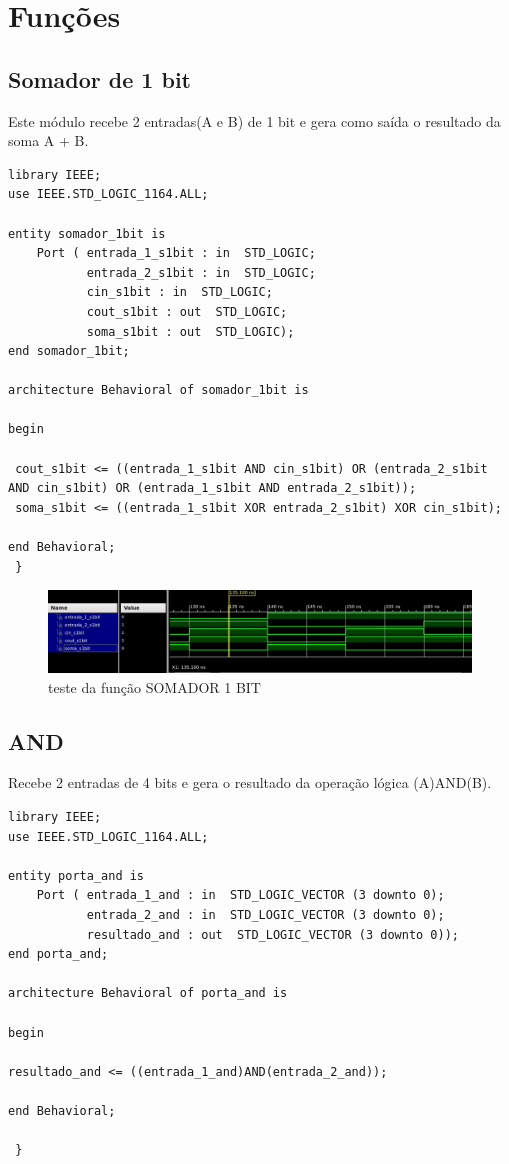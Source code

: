 \documentclass[a4paper,12pt,twoside]{article}
\begin{document}
\section{Funções}
\subsection{Somador de 1 bit}
    Este módulo recebe 2 entradas(A e B) de 1 bit e gera como saída o resultado da soma A + B.
    
\begin{lstlisting}
library IEEE;
use IEEE.STD_LOGIC_1164.ALL;

entity somador_1bit is
    Port ( entrada_1_s1bit : in  STD_LOGIC;
           entrada_2_s1bit : in  STD_LOGIC;
           cin_s1bit : in  STD_LOGIC;
           cout_s1bit : out  STD_LOGIC;
           soma_s1bit : out  STD_LOGIC);
end somador_1bit;

architecture Behavioral of somador_1bit is

begin

 cout_s1bit <= ((entrada_1_s1bit AND cin_s1bit) OR (entrada_2_s1bit AND cin_s1bit) OR (entrada_1_s1bit AND entrada_2_s1bit));
 soma_s1bit <= ((entrada_1_s1bit XOR entrada_2_s1bit) XOR cin_s1bit);

end Behavioral;
 } \end{lstlisting}
 
  \begin{figure}[H]
\centering
\includegraphics[scale=0.55]{testes/somador1bit.jpeg}
\caption{teste da função SOMADOR 1 BIT}
\label{fig:diagrama}
\end{figure}

 
\subsection{AND}
Recebe 2 entradas de 4 bits e gera o resultado da operação lógica (A)AND(B).

\begin{lstlisting}
library IEEE;
use IEEE.STD_LOGIC_1164.ALL;

entity porta_and is
    Port ( entrada_1_and : in  STD_LOGIC_VECTOR (3 downto 0);
           entrada_2_and : in  STD_LOGIC_VECTOR (3 downto 0);
           resultado_and : out  STD_LOGIC_VECTOR (3 downto 0));
end porta_and;

architecture Behavioral of porta_and is

begin

resultado_and <= ((entrada_1_and)AND(entrada_2_and));

end Behavioral;

 } \end{lstlisting}
 
\end{document}

